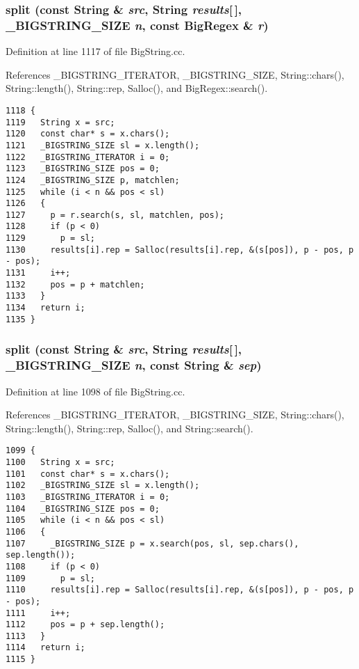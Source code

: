 \subsubsection{ split (const {\bf String} \& {\em src}, {\bf String} {\em results}[$\,$], {\bf \_\-BIGSTRING\_\-SIZE} {\em n}, const {\bf Big\-Regex} \& {\em r})}\label{BigString_8cc_a32}




Definition at line 1117 of file Big\-String.cc.

References \_\-BIGSTRING\_\-ITERATOR, \_\-BIGSTRING\_\-SIZE, String::chars(), String::length(), String::rep, Salloc(), and Big\-Regex::search().



\footnotesize\begin{verbatim}1118 {
1119   String x = src;
1120   const char* s = x.chars();
1121   _BIGSTRING_SIZE sl = x.length();
1122   _BIGSTRING_ITERATOR i = 0;
1123   _BIGSTRING_SIZE pos = 0;
1124   _BIGSTRING_SIZE p, matchlen;
1125   while (i < n && pos < sl)
1126   {
1127     p = r.search(s, sl, matchlen, pos);
1128     if (p < 0)
1129       p = sl;
1130     results[i].rep = Salloc(results[i].rep, &(s[pos]), p - pos, p - pos);
1131     i++;
1132     pos = p + matchlen;
1133   }
1134   return i;
1135 }
\end{verbatim}\normalsize 
{}
\subsubsection{ split (const {\bf String} \& {\em src}, {\bf String} {\em results}[$\,$], {\bf \_\-BIGSTRING\_\-SIZE} {\em n}, const {\bf String} \& {\em sep})}\label{BigString_8cc_a31}




Definition at line 1098 of file Big\-String.cc.

References \_\-BIGSTRING\_\-ITERATOR, \_\-BIGSTRING\_\-SIZE, String::chars(), String::length(), String::rep, Salloc(), and String::search().



\footnotesize\begin{verbatim}1099 {
1100   String x = src;
1101   const char* s = x.chars();
1102   _BIGSTRING_SIZE sl = x.length();
1103   _BIGSTRING_ITERATOR i = 0;
1104   _BIGSTRING_SIZE pos = 0;
1105   while (i < n && pos < sl)
1106   {
1107     _BIGSTRING_SIZE p = x.search(pos, sl, sep.chars(), sep.length());
1108     if (p < 0)
1109       p = sl;
1110     results[i].rep = Salloc(results[i].rep, &(s[pos]), p - pos, p - pos);
1111     i++;
1112     pos = p + sep.length();
1113   }
1114   return i;
1115 }
\end{verbatim}\normalsize 
{}
